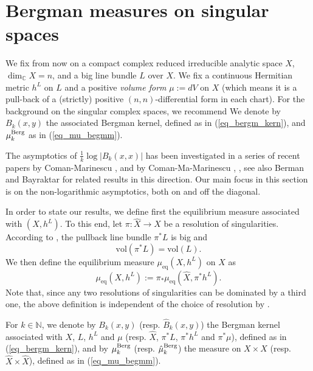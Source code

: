\documentclass[12pt]{article}
\numberwithin{equation}{section}
\theoremstyle{theorem}
\theoremstyle{definition}
\theoremstyle{remark}
\newcommand{\comp}{\mathbb{C}}
\newcommand{\nat}{\mathbb{N}}
\begin{document}
	\section{Bergman measures on singular spaces}\label{sect_sing}
	We fix from now on a compact complex reduced irreducible analytic space $X$, $\dim_{\comp} X = n$, and a big line bundle $L$ over $X$.
	We fix a continuous Hermitian metric $h^L$ on $L$ and a positive \textit{volume form} $\mu := dV$ on $X$ (which means it is a pull-back of a (strictly) positive $(n, n)$-differential form in each chart).
	For the background on the singular complex spaces, we recommend \cite[\S II.9]{DemCompl}
	We denote by $B_k(x, y)$ the associated Bergman kernel, defined as in (\ref{eq_bergm_kern}), and $\mu_k^{\rm{Berg}}$ as in (\ref{eq_mu_begmm}).
	\par 
	The asymptotics of $\frac{1}{k} \log |B_k(x, x)|$ has been investigated in a series of recent papers by Coman-Marinescu \cite{ComMar}, and by Coman-Ma-Marinescu \cite{ComanMaMarinGT}, \cite{ComanMaMarMoish}, see also Berman \cite[Theorem 1.5]{BermanEnvProj} and Bayraktar \cite[Proposition 2.9]{BayraktarEquidistr} for related results in this direction.  
	Our main focus in this section is on the non-logarithmic asymptotics, both on and off the diagonal.
	\par 
	In order to state our results, we define first the equilibrium measure associated with $(X, h^L)$.  
	To this end, let $\pi : \hat{X} \to X$ be a resolution of singularities.  
	According to \cite[Proposition 2.2.43]{LazarBookI}, the pullback line bundle $\pi^* L$ is big and
	\begin{equation}\label{eq_vol_resol}
    	\mathrm{vol}(\pi^* L) = \mathrm{vol}(L).
	\end{equation}
	We then define the equilibrium measure $\mu_{\mathrm{eq}}(X, h^L)$ on $X$ as
	\begin{equation}\label{eq_defn_eq_sing}
    	\mu_{\mathrm{eq}}(X, h^L) := \pi_* \mu_{\mathrm{eq}}(\hat{X}, \pi^* h^L).
	\end{equation}
	Note that, since any two resolutions of singularities can be dominated by a third one, the above definition is independent of the choice of resolution by \cite[Proposition 1.9]{BermanBouckBalls}.
	\par 
	For $k \in \nat$, we denote by $B_k(x, y)$ (resp. $\hat{B}_k(x, y)$) the Bergman kernel associated with $X$, $L$, $h^L$ and $\mu$ (resp. $\hat{X}$, $\pi^* L$, $\pi^* h^L$ and $\pi^* \mu$), defined as in (\ref{eq_bergm_kern}), and by $\mu_k^{\rm{Berg}}$ (resp. $\hat{\mu}_k^{\rm{Berg}}$) the measure on $X \times X$ (resp. $\hat{X} \times \hat{X}$), defined as in (\ref{eq_mu_begmm}).
\end{document}
